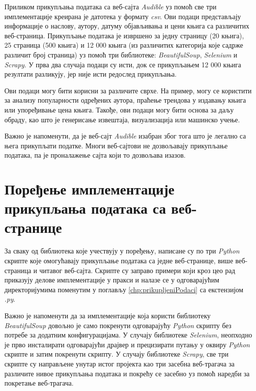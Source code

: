 \documentclass[12pt,oneside]{memoir}
\begin{document}
Приликом прикупљања података са веб-сајта \textit{Audible} уз помоћ све три имплементације креирана је датотека у формату \textit{csv}. Ови подаци представљају информације о наслову, аутору, датуму објављивања и цени књига са различитих веб-страница. Прикупљање података је извршено за једну страницу (20 књига), 25 страница (500 књига) и 12 000 књига (из различитих категорија које садрже различит број страница) уз помоћ три библиотеке: \textit{BeautifulSoup}, \textit{Selenium} и \textit{Scrapy}. У прва два случаја подаци су исти, док се прикупљањем 12 000 књига резултати разликују, јер није исти редослед прикупљања.

Ови подаци могу бити корисни за различите сврхе. На пример, могу се користити за анализу популарности одређених аутора, праћење трендова у издавању књига или упоређивање цена књига. Такође, ови подаци могу бити основа за даљу обраду, као што је генерисање извештаја, визуализација или машинско учење.

Важно је напоменути, да је веб-сајт \textit{Audible} изабран због тога што је легално са њега прикупљати податке. Многи веб-сајтови не дозвољавају прикупљање података, па је проналажење сајта који то дозвољава изазов. 

\section{Поређење имплементације прикупљања података са веб-странице}
За сваку од библиотека које учествују у поређењу, написане су по три \textit{Python} скрипте које омогућавају прикупљање података са једне веб-странице, више веб-страница и читавог веб-сајта. Скрипте су заправо примери који кроз цео рад приказују делове имплементације у пракси и налазе се у одговарајућим директоријумима поменутим у поглављу \ref{chp:prikupljeniPodaci} 
са екстензијом \textit{.py}.

Важно је напоменути да за имплементације која користи библиотеку \\ \textit{BeautifulSoup} довољно је само покренути одговарајућу \textit{Python} скрипту без потребе за додатним конфигурацијама. У случају библиотеке \textit{Selenium}, неопходно је прво инсталирати одговарајући драјвер и прецизирати путању у оквиру \textit{Python} скрипте и затим покренути скрипту. У случају библиотеке \textit{Scrapy}, све три скрипте су направљене унутар истог пројекта као три засебна веб-трагача за различите нивое прикупљања података и покрећу се засебно уз помоћ наредби за покретање веб-трагача. 
\end{document}
